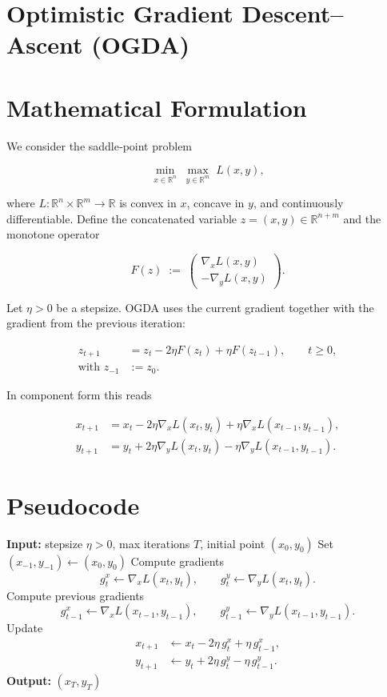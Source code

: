 \documentclass{article}
\newcommand{\R}{\mathbb{R}}
\begin{document}
\section*{Optimistic Gradient Descent--Ascent (OGDA)}

\section*{Mathematical Formulation}
We consider the saddle‑point problem  

\[
\min_{x\in\R^{n}}\;\max_{y\in\R^{m}} \;L(x,y),
\]

where \(L:\R^{n}\times\R^{m}\rightarrow\R\) is convex in \(x\), concave in \(y\), and continuously differentiable.
Define the concatenated variable \(z\!=\!(x,y)\in\R^{n+m}\) and the monotone operator  

\[
F(z)\;:=\;\begin{pmatrix}
\nabla_{x}L(x,y)\\[2mm]
-\nabla_{y}L(x,y)
\end{pmatrix}.
\]

Let \(\eta>0\) be a stepsize.  
OGDA uses the current gradient together with the gradient from the previous iteration:

\[
\boxed{
\begin{aligned}
z_{t+1}&=z_{t}-2\eta F(z_{t})+\eta F(z_{t-1}),\qquad t\ge 0,\\[1mm]
\text{with }z_{-1}&:=z_{0}.
\end{aligned}}
\]

In component form this reads  

\[
\begin{aligned}
x_{t+1}&=x_{t}-2\eta\nabla_{x}L(x_{t},y_{t})+\eta\nabla_{x}L(x_{t-1},y_{t-1}),\\
y_{t+1}&=y_{t}+2\eta\nabla_{y}L(x_{t},y_{t})-\eta\nabla_{y}L(x_{t-1},y_{t-1}).
\end{aligned}
\]

\section*{Pseudocode}
\begin{algorithm}[H]
\caption{Optimistic Gradient Descent–Ascent (OGDA)}
\begin{algorithmic}[1]
\State \textbf{Input:} stepsize \(\eta>0\), max iterations \(T\), initial point \((x_{0},y_{0})\)
\State Set \((x_{-1},y_{-1})\gets (x_{0},y_{0})\)
    \State Compute gradients 
    \[
    g^{x}_{t}\gets\nabla_{x}L(x_{t},y_{t}),\qquad
    g^{y}_{t}\gets\nabla_{y}L(x_{t},y_{t}).
    \]
    \State Compute previous gradients 
    \[
    g^{x}_{t-1}\gets\nabla_{x}L(x_{t-1},y_{t-1}),\qquad
    g^{y}_{t-1}\gets\nabla_{y}L(x_{t-1},y_{t-1}).
    \]
    \State Update
    \[
    \begin{aligned}
    x_{t+1}&\gets x_{t}-2\eta\,g^{x}_{t}+\eta\,g^{x}_{t-1},\\
    y_{t+1}&\gets y_{t}+2\eta\,g^{y}_{t}-\eta\,g^{y}_{t-1}.
    \end{aligned}
    \]
\EndFor
\State \textbf{Output:} \((x_{T},y_{T})\)
\end{algorithmic}
\end{algorithm}
\end{document}
